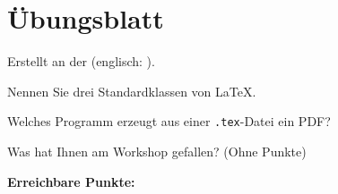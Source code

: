 \documentclass[a4paper,11pt]{article}
\newcounter{aufgabe}
\newcounter{punkte}
\begin{document}
\section*{Übungsblatt}
Erstellt an der \fh{} (englisch: \fh*).

Nennen Sie drei Standardklassen von \LaTeX.

Welches Programm erzeugt aus einer \texttt{.tex}-Datei ein PDF?

Was hat Ihnen am Workshop gefallen? (Ohne Punkte)

\bigskip
\noindent\textbf{Erreichbare Punkte: \thepunkte}
\end{document}
